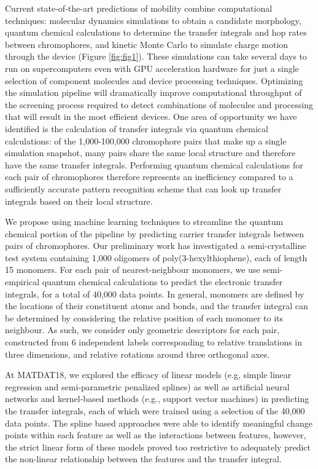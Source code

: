 \documentclass[12pt]{article}
\begin{document}
Current state-of-the-art predictions of mobility combine computational techniques: molecular dynamics simulations to obtain a candidate morphology, quantum chemical calculations to determine the transfer integrals and hop rates between chromophores, and kinetic Monte Carlo to simulate charge motion through the device (Figure \ref{fig:fig1})\cite{MorphCT,Jones2016,Jones2017}.
These simulations can take several days to run on supercomputers even with GPU acceleration hardware for just a single selection of component molecules and device processing techniques.
Optimizing the simulation pipeline will dramatically improve computational throughput of the screening process required to detect combinations of molecules and processing that will result in the most efficient devices.
One area of opportunity we have identified is the calculation of transfer integrals via quantum chemical calculations: of the 1,000-100,000 chromophore pairs that make up a single simulation snapshot, many pairs share the same local structure and therefore have the same transfer integrals.
Performing quantum chemical calculations for each pair of chromophores therefore represents an inefficiency compared to a sufficiently accurate pattern recognition scheme that can look up transfer integrals based on their local structure.

We propose using machine learning techniques to streamline the quantum chemical portion of the pipeline by predicting carrier transfer integrals between pairs of chromophores.
Our preliminary work has investigated a semi-crystalline test system containing 1,000 oligomers of poly(3-hexylthiophene), each of length 15 monomers.
For each pair of nearest-neighbour monomers, we use semi-empirical quantum chemical calculations to predict the electronic transfer integrals, for a total of 40,000 data points.
In general, monomers are defined by the locations of their constituent atoms and bonds, and the transfer integral can be determined by considering the relative position of each monomer to its neighbour.
As such, we consider only geometric descriptors for each pair, constructed from 6 independent labels corresponding to relative translations in three dimensions, and relative rotations around three orthogonal axes.

At MATDAT18, we explored the efficacy of linear models (e.g, simple linear regression and semi-parametric penalized splines) as well as artificial neural networks and kernel-based methods (e.g., support vector machines) in predicting the transfer integrals, each of which were trained using a selection of the 40,000 data points.  The spline based approaches were able to identify meaningful change points within each feature as well as the interactions between features, however, the strict linear form of these models proved too restrictive to adequately predict the non-linear relationship between the features and the transfer integral. 
\end{document}
